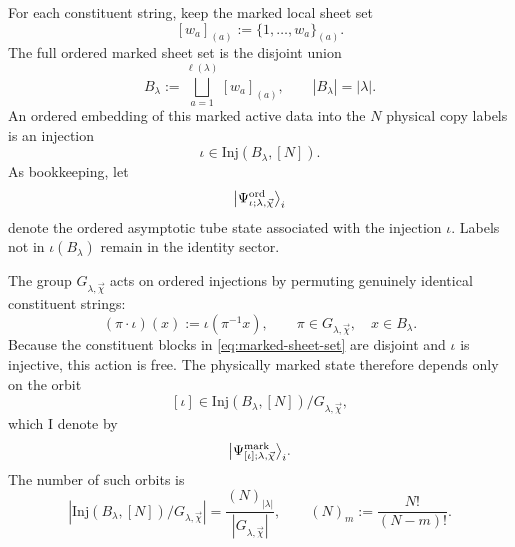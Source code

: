\documentclass[11pt]{article}
\newcommand{\Inj}{\mathrm{Inj}}
\begin{document}
For each constituent string, keep the marked local sheet set
\[
[w_a]_{(a)}:=\{1,\dots,w_a\}_{(a)}.
\]
The full ordered marked sheet set is the disjoint union
\begin{equation}\label{eq:marked-sheet-set}
B_\lambda
:=
\bigsqcup_{a=1}^{\ell(\lambda)} [w_a]_{(a)},
\qquad
|B_\lambda|=|\lambda|.
\end{equation}
An ordered embedding of this marked active data into the $N$ physical copy labels is an injection
\begin{equation}\label{eq:general-ordered-injection}
\iota\in \Inj(B_\lambda,[N]).
\end{equation}
As bookkeeping, let
\begin{equation}\label{eq:ordered-bookkeeping-state}
\bigl|\Psi^{\rm ord}_{\iota;\lambda,\vec\chi}\bigr\rangle_i
\end{equation}
denote the ordered asymptotic tube state associated with the injection $\iota$. Labels not in $\iota(B_\lambda)$ remain in the identity sector.

The group $G_{\lambda,\vec\chi}$ acts on ordered injections by permuting genuinely identical constituent strings:
\begin{equation}\label{eq:group-action-on-injections}
(\pi\cdot \iota)(x):=\iota(\pi^{-1}x),
\qquad
\pi\in G_{\lambda,\vec\chi},
\quad
x\in B_\lambda.
\end{equation}
Because the constituent blocks in \eqref{eq:marked-sheet-set} are disjoint and $\iota$ is injective, this action is free. The physically marked state therefore depends only on the orbit
\begin{equation}\label{eq:orbit-of-injection}
[\iota]\in \Inj(B_\lambda,[N]) / G_{\lambda,\vec\chi},
\end{equation}
which I denote by
\begin{equation}\label{eq:marked-physical-state}
\bigl|\Psi^{\rm mark}_{[\iota];\lambda,\vec\chi}\bigr\rangle_i.
\end{equation}
The number of such orbits is
\begin{equation}\label{eq:number-of-marked-orbits}
\left|
\Inj(B_\lambda,[N]) / G_{\lambda,\vec\chi}
\right|
=
\frac{(N)_{|\lambda|}}{|G_{\lambda,\vec\chi}|},
\qquad
(N)_m:=\frac{N!}{(N-m)!}.
\end{equation}
\end{document}
